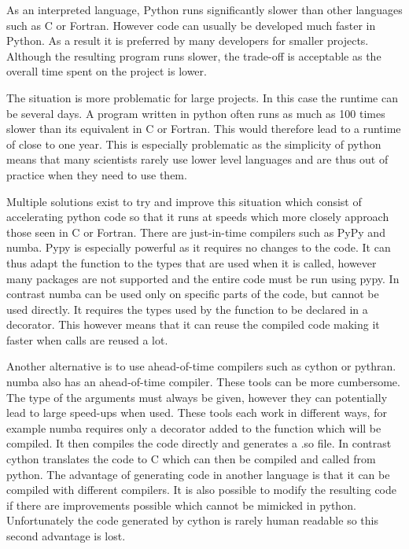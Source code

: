 
As an interpreted language, Python runs significantly slower than other languages such as C or Fortran. However code can usually be developed much faster in Python. As a result it is preferred by many developers for smaller projects. Although the resulting program runs slower, the trade-off is acceptable as the overall time spent on the project is lower.

The situation is more problematic for large projects. In this case the runtime can be several days. A program written in python often runs as much as 100 times slower than its equivalent in C or Fortran. This would therefore lead to a runtime of close to one year. This is especially problematic as the simplicity of python means that many scientists rarely use lower level languages and are thus out of practice when they need to use them.

Multiple solutions exist to try and improve this situation which consist of accelerating python code so that it runs at speeds which more closely approach those seen in C or Fortran. There are just-in-time compilers such as PyPy and numba. Pypy is especially powerful as it requires no changes to the code. It can thus adapt the function to the types that are used when it is called, however many packages are not supported and the entire code must be run using pypy. In contrast numba can be used only on specific parts of the code, but cannot be used directly. It requires the types used by the function to be declared in a decorator. This however means that it can reuse the compiled code making it faster when calls are reused a lot.

Another alternative is to use ahead-of-time compilers such as cython or pythran. numba also has an ahead-of-time compiler. These tools can be more cumbersome. The type of the arguments must always be given, however they can potentially lead to large speed-ups when used. These tools each work in different ways, for example numba requires only a decorator added to the function which will be compiled. It then compiles the code directly and generates a .so file. In contrast cython translates the code to C which can then be compiled and called from python. The advantage of generating code in another language is that it can be compiled with different compilers. It is also possible to modify the resulting code if there are improvements possible which cannot be mimicked in python. Unfortunately the code generated by cython is rarely human readable so this second advantage is lost.

